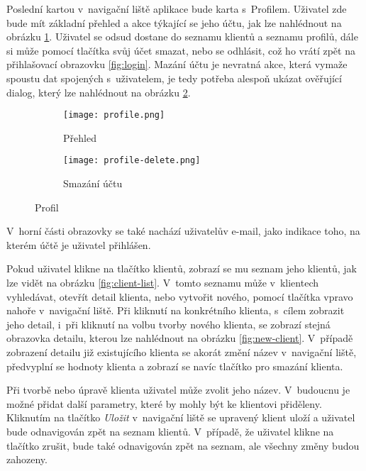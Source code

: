 Poslední kartou v~navigační liště aplikace bude karta s~Profilem. Uživatel zde bude mít základní přehled a akce týkající se jeho účtu, jak lze nahlédnout na obrázku \ref{fig:profile-overview}. Uživatel se odsud dostane do seznamu klientů a seznamu profilů, dále si může pomocí tlačítka svůj účet smazat, nebo se odhlásit, což ho vrátí zpět na přihlašovací obrazovku \ref{fig:login}. Mazání účtu je nevratná akce, která vymaže spoustu dat spojených s~uživatelem, je tedy potřeba alespoň ukázat ověřující dialog, který lze nahlédnout na obrázku \ref{fig:profile-delete}. 

\begin{figure}[h]
    \centering
    \begin{subfigure}[b]{0.4\textwidth}
		\centering
		\texttt{[image: profile.png]}
		\caption{Přehled}
		\label{fig:profile-overview}
	\end{subfigure}
	\hspace{2cm}
	\begin{subfigure}[b]{0.4\textwidth}
		\centering
		\texttt{[image: profile-delete.png]}
		\caption{Smazání účtu}
		\label{fig:profile-delete}
	\end{subfigure}
	\caption{Profil}
	\label{fig:profile}
\end{figure}

V~horní části obrazovky se také nachází uživatelův e-mail, jako indikace toho, na kterém účtě je uživatel přihlášen.

Pokud uživatel klikne na tlačítko klientů, zobrazí se mu seznam jeho klientů, jak lze vidět na obrázku \ref{fig:client-list}. V~tomto seznamu může v~klientech vyhledávat, otevřít detail klienta, nebo vytvořit nového, pomocí tlačítka vpravo nahoře v~navigační liště. Při kliknutí na konkrétního klienta, s~cílem zobrazit jeho detail, i~při kliknutí na volbu tvorby nového klienta, se zobrazí stejná obrazovka detailu, kterou lze nahlédnout na obrázku \ref{fig:new-client}. V~případě zobrazení detailu již existujícího klienta se akorát změní název v~navigační liště, předvyplní se hodnoty klienta a zobrazí se navíc tlačítko pro smazání klienta.

Při tvorbě nebo úpravě klienta uživatel může zvolit jeho název. V~budoucnu je možné přidat další parametry, které by mohly být ke klientovi přiděleny. Kliknutím na tlačítko \emph{Uložit} v~navigační liště se upravený klient uloží a uživatel bude odnavigován zpět na seznam klientů. V~případě, že uživatel klikne na tlačítko zrušit, bude také odnavigován zpět na seznam, ale všechny změny budou zahozeny.

